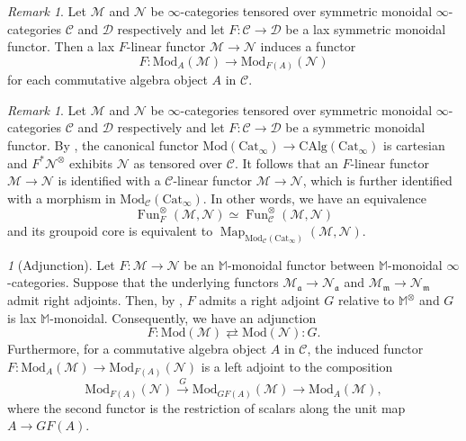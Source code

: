 \documentclass{amsart}
\theoremstyle{plain}
\theoremstyle{definition}
\theoremstyle{remark}
\newtheorem{remark}[theorem]{Remark}
\newtheorem{p}[theorem]{}
\numberwithin{equation}{theorem}
\newcommand{\mcal}[1]{\mathcal{#1}}
\newcommand{\mbb}[1]{\mathbb{#1}}
\newcommand{\mfk}[1]{\mathfrak{#1}}
\newcommand{\CAlg}{\mathrm{CAlg}}
\newcommand{\Cat}{\mathrm{Cat}}
\newcommand{\Mod}{\mathrm{Mod}}
\newcommand{\Fun}{\operatorname{Fun}}
\newcommand{\Map}{\operatorname{Map}}
\begin{document}
\begin{remark}
Let $\mcal{M}$ and $\mcal{N}$ be $\infty$-categories tensored over symmetric monoidal $\infty$-categories $\mcal{C}$ and $\mcal{D}$ respectively and let $F\colon\mcal{C}\to\mcal{D}$ be a lax symmetric monoidal functor.
Then a lax $F$-linear functor $\mcal{M}\to\mcal{N}$ induces a functor
\[
	F \colon \Mod_A(\mcal{M}) \to \Mod_{F(A)}(\mcal{N})
\]
for each commutative algebra object $A$ in $\mcal{C}$.
\end{remark}

\begin{remark}
Let $\mcal{M}$ and $\mcal{N}$ be $\infty$-categories tensored over symmetric monoidal $\infty$-categories $\mcal{C}$ and $\mcal{D}$ respectively and let $F\colon\mcal{C}\to\mcal{D}$ be a symmetric monoidal functor.
By \cite[4.2.3.2]{HA}, the canonical functor $\Mod(\Cat_\infty)\to\CAlg(\Cat_\infty)$ is cartesian and $F^*\mcal{N}^\otimes$ exhibits $\mcal{N}$ as tensored over $\mcal{C}$.
It follows that an $F$-linear functor $\mcal{M}\to\mcal{N}$ is identified with a $\mcal{C}$-linear functor $\mcal{M}\to\mcal{N}$, which is further identified with a morphism in $\Mod_\mcal{C}(\Cat_\infty)$.
In other words, we have an equivalence
\[
	\Fun_F^\otimes(\mcal{M},\mcal{N}) \simeq \Fun_\mcal{C}^\otimes(\mcal{M},\mcal{N})
\]
and its groupoid core is equivalent to $\Map_{\Mod_\mcal{C}(\Cat_\infty)}(\mcal{M},\mcal{N})$.
\end{remark}

\begin{p}[Adjunction]\label{p:Mod}
Let $F\colon\mcal{M}\to\mcal{N}$ be an $\mbb{M}$-monoidal functor between $\mbb{M}$-monoidal $\infty$-categories.
Suppose that the underlying functors $\mcal{M}_\mfk{a}\to\mcal{N}_\mfk{a}$ and $\mcal{M}_\mfk{m}\to\mcal{N}_\mfk{m}$ admit right adjoints.
Then, by \cite[7.3.2.7]{HA}, $F$ admits a right adjoint $G$ relative to $\mbb{M}^\otimes$ and $G$ is lax $\mbb{M}$-monoidal.
Consequently, we have an adjunction
\[
	F \colon \Mod(\mcal{M}) \rightleftarrows \Mod(\mcal{N}) \colon G.
\]
Furthermore, for a commutative algebra object $A$ in $\mcal{C}$, the induced functor $F\colon\Mod_A(\mcal{M})\to\Mod_{F(A)}(\mcal{N})$ is a left adjoint to the composition
\[
	\Mod_{F(A)}(\mcal{N}) \xrightarrow{G} \Mod_{GF(A)}(\mcal{M}) \to \Mod_A(\mcal{M}),
\]
where the second functor is the restriction of scalars along the unit map $A\to GF(A)$. 
\end{p}
\end{document}
